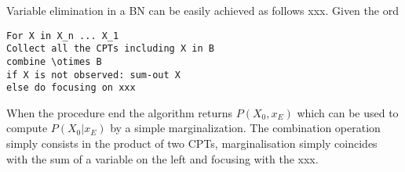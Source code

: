 Variable elimination in a BN can be easily achieved as follows xxx. Given the ord

\begin{verbatim}
For X in X_n ... X_1
Collect all the CPTs including X in B
combine \otimes B
if X is not observed: sum-out X
else do focusing on xxx
\end{verbatim}
When the procedure end the algorithm returns $P(X_0,x_E)$ which can be used to compute $P(X_0|x_E)$ by a simple marginalization. The combination operation simply consists in the product of two CPTs, marginalisation simply coincides with the sum of a variable on the left and focusing with the xxx.
